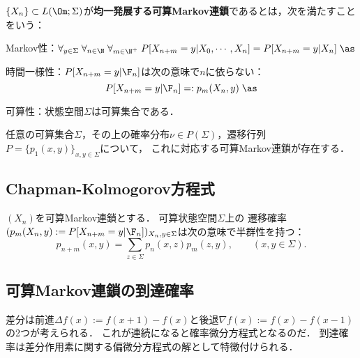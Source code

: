 \documentclass[uplatex,dvipdfmx]{jsreport}
\begin{document}
\begin{definition}
    $\{X_n\}\subset L(\Om;\Sigma)$が\textbf{均一発展する可算Markov連鎖}であるとは，次を満たすことをいう：
    \begin{enumerate}[{[A}1{]}]
        \item Markov性：$\forall_{y\in\Sigma}\;\forall_{n\in\N}\;\forall_{m\in\N^+}\;P[X_{n+m}=y|X_0,\cdots,X_n]=P[X_{n+m}=y|X_n]\;\as$
        \item 時間一様性：$P[X_{n+m}=y|\F_n]$は次の意味で$n$に依らない：
        \[P[X_{n+m}=y|\F_n]=:p_m(X_n,y)\;\as\]
        \item 可算性：状態空間$\Sigma$は可算集合である．
    \end{enumerate}
\end{definition}

\begin{theorem}
    任意の可算集合$\Sigma$，その上の確率分布$\nu\in P(\Sigma)$，遷移行列$P=\{p_1(x,y)\}_{x,y\in\Sigma}$について，
    これに対応する可算Markov連鎖が存在する．
\end{theorem}

\subsection{Chapman-Kolmogorov方程式}

\begin{proposition}
    $(X_n)$を可算Markov連鎖とする．
    可算状態空間$\Sigma$上の
    遷移確率$(p_m(X_n,y):=P[X_{n+m}=y|\F_n])_{X_n,y\in\Sigma}$は次の意味で半群性を持つ：
    \[p_{n+m}(x,y)=\sum_{z\in\Sigma}p_n(x,z)p_m(z,y),\qquad(x,y\in\Sigma).\]
\end{proposition}

\subsection{可算Markov連鎖の到達確率}

\begin{tcolorbox}[colframe=ForestGreen, colback=ForestGreen!10!white,breakable,colbacktitle=ForestGreen!40!white,coltitle=black,fonttitle=\bfseries\sffamily,
    title=]
    差分は前進$\Delta f(x):=f(x+1)-f(x)$と後退$\nabla f(x):=f(x)-f(x-1)$の2つが考えられる．
    これが連続になると確率微分方程式となるのだ．
    到達確率は差分作用素に関する偏微分方程式の解として特徴付けられる．
\end{tcolorbox}
\end{document}
